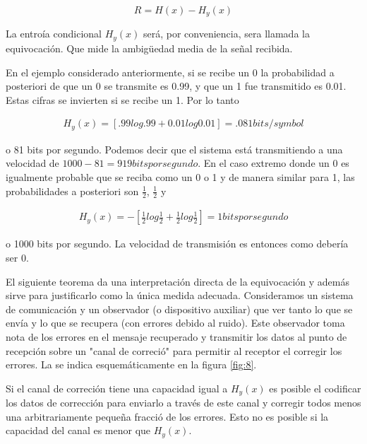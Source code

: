 \begin{equation}
R = H(x)- H_y(x)
\end{equation}

La entro\'{i}a condicional $H_y(x)$ ser\'{a}, por conveniencia, sera llamada la equivocaci\'{o}n. Que mide la ambigüedad media de la se\~{n}al recibida.

En el ejemplo considerado anteriormente, si se recibe un 0 la probabilidad a posteriori de que un 0 se transmite es 0.99, y que un 1 fue transmitido es 0.01. Estas cifras se invierten si se recibe un 1. Por lo tanto

\begin{equation}
\begin{array}{rcl}
H_y(x) = [.99 log .99+ 0.01 log 0.01]
= .081 bits/symbol
\end{array}
\end{equation}

o 81 bits por segundo. Podemos decir que el sistema est\'{a} transmitiendo a una velocidad de $1000-81 = 919 bits por segundo$. En el caso extremo donde un 0 es igualmente probable que se reciba como un 0 o 1 y de manera similar para 1, las probabilidades a posteriori son $\frac{1}{2}$, $\frac{1}{2}$ y

\begin{equation}
\begin{array}{rcl}
H_y(x) = - \left [\frac{1}{2} log \frac{1}{2} + \frac{1}{2} log \frac{1}{2} \right]
= 1 bits por segundo
\end{array}
\end{equation}

o 1000 bits por segundo. La velocidad de transmisi\'{o}n es entonces como deber\'{i}a ser 0.

El siguiente teorema da una interpretaci\'{o}n directa de la equivocaci\'{o}n y adem\'{a}s sirve para justificarlo como la \'{u}nica medida adecuada. Consideramos un sistema de comunicaci\'{o}n y un observador (o dispositivo auxiliar) que ver tanto lo que se env\'{i}a y lo que se recupera (con errores debido al ruido). Este observador toma nota de los errores en el mensaje recuperado y transmitir los datos al punto de recepci\'{o}n sobre un "canal de correci\'{o}" para permitir al receptor el corregir los errores. La se indica esquem\'{a}ticamente en la figura \ref{fig:8}.

\begin{theorem}
\label{th:10}
Si el canal de correci\'{o}n tiene una capacidad igual a $H_y(x)$ es posible el codificar los datos de correcci\'{o}n para enviarlo a trav\'{e}s de este canal y corregir todos menos una arbitrariamente peque\~{n}a fracci\'{o} de los errores. Esto no es posible si la capacidad del canal es menor que $H_y(x)$.
\end{theorem}

